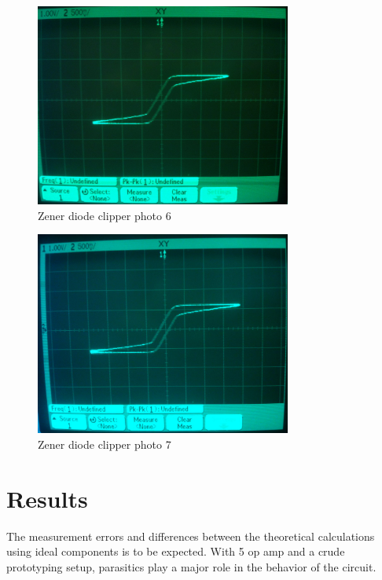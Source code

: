 \documentclass[11pt,a4paper]{article}
\begin{document}
\begin{figure}[htbp]
    \centering
    \includegraphics[width=0.75\textwidth]{img/clip_xy_6.jpg}
    \caption{Zener diode clipper photo 6}
    \label{fig:clip_xy_6}
\end{figure}

\begin{figure}[htbp]
    \centering
    \includegraphics[width=0.75\textwidth]{img/clip_xy_7.jpg}
    \caption{Zener diode clipper photo 7}
    \label{fig:clip_xy_7}
\end{figure}


\section{Results}\label{setup}
The measurement errors and differences between the theoretical calculations
using ideal components is to be expected. With 5%
op amp and a crude prototyping setup, parasitics play a major role in the
behavior of the circuit. 
\end{document}
